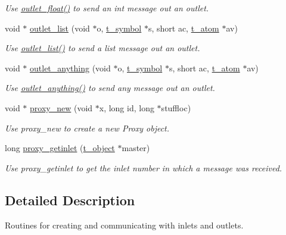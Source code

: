 \begin{DoxyCompactItemize}
\begin{DoxyCompactList}\small\item\em Use \hyperlink{group__inout_gafbb3f62a413f05a394391afde5b3c30f}{outlet\_\-float()} to send an int message out an outlet. \item\end{DoxyCompactList}\item 
void $\ast$ \hyperlink{group__inout_gabdef4fbe6e1040dc28204b8070bdcda5}{outlet\_\-list} (void $\ast$o, \hyperlink{structt__symbol}{t\_\-symbol} $\ast$s, short ac, \hyperlink{structt__atom}{t\_\-atom} $\ast$av)
\begin{DoxyCompactList}\small\item\em Use \hyperlink{group__inout_gabdef4fbe6e1040dc28204b8070bdcda5}{outlet\_\-list()} to send a list message out an outlet. \item\end{DoxyCompactList}\item 
void $\ast$ \hyperlink{group__inout_ga12798ee897e01dac21ee547c4091d8a8}{outlet\_\-anything} (void $\ast$o, \hyperlink{structt__symbol}{t\_\-symbol} $\ast$s, short ac, \hyperlink{structt__atom}{t\_\-atom} $\ast$av)
\begin{DoxyCompactList}\small\item\em Use \hyperlink{group__inout_ga12798ee897e01dac21ee547c4091d8a8}{outlet\_\-anything()} to send any message out an outlet. \item\end{DoxyCompactList}\item 
void $\ast$ \hyperlink{group__inout_ga65676568dda565aba2dd13c9f88c9f91}{proxy\_\-new} (void $\ast$x, long id, long $\ast$stuffloc)
\begin{DoxyCompactList}\small\item\em Use proxy\_\-new to create a new Proxy object. \item\end{DoxyCompactList}\item 
long \hyperlink{group__inout_gae81f89a78389587dc23d641e38b42481}{proxy\_\-getinlet} (\hyperlink{structt__object}{t\_\-object} $\ast$master)
\begin{DoxyCompactList}\small\item\em Use proxy\_\-getinlet to get the inlet number in which a message was received. \item\end{DoxyCompactList}\end{DoxyCompactItemize}


\subsection{Detailed Description}
Routines for creating and communicating with inlets and outlets. 

